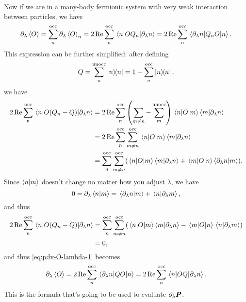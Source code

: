 \documentclass[hyperref, a4paper]{article}
\begin{document}
Now if we are in a many-body fermionic system with very weak interaction between particles,
we have 
\begin{equation}
    \partial_\lambda \expval{O} = \sum_{n}^{\text{occ}} \partial_\lambda \expval{O}_n
    = 2 \Re \sum_{n}^{\text{occ}} \mel{n}{O Q_n}{\partial_\lambda n}
    = 2 \Re \sum_{n}^{\text{occ}} \mel{\partial_\lambda n}{Q_n O}{n}.
    \label{eq:pdv-O-lambda-1}
\end{equation}
This expression can be further simplified:
after defining 
\begin{equation}
    Q = \sum_{n}^{\text{unocc}} \dyad{n} = 1 - \sum_{n}^{\text{occ}} \dyad{n},
\end{equation}
we have
\[
    \begin{aligned}
        2\Re \sum_{n}^{\text{occ}} \mel{n}{O (Q_n - Q)}{\partial_\lambda n}
        &= 2\Re \sum_{n}^{\text{occ}}  \left(
            \sum_{m \neq n} 
            - \sum_{m}^{\text{unocc}}
        \right)
        \mel{n}{O}{m} \braket{m}{\partial_\lambda n}  \\
        &= 2\Re \sum_{n}^{\text{occ}} \sum_{m \neq n}^{\text{occ}}
        \mel{n}{O}{m} \braket{m}{\partial_\lambda n} \\
        &= \sum_{n}^{\text{occ}} \sum_{m \neq n}^{\text{occ}}
        (
            \mel{n}{O}{m} \braket{m}{\partial_\lambda n}
            + \mel{m}{O}{n} \braket{\partial_\lambda n}{m}
        ).
    \end{aligned}
\]
Since $\braket{n}{m}$ doesn't change no matter how you adjust $\lambda$,
we have 
\begin{equation}
    0 = \partial_\lambda \braket{n}{m} 
    = \braket*{\partial_\lambda n}{m} 
    + \braket*{n}{\partial_\lambda m},
    \label{eq:switch-partial}
\end{equation}
and thus 
\[
    \begin{aligned}
        2\Re \sum_{n}^{\text{occ}} \mel{n}{O (Q_n - Q)}{\partial_\lambda n}
        &= \sum_{n}^{\text{occ}} \sum_{m \neq n}^{\text{occ}}
        (
            \mel{n}{O}{m} \braket{m}{\partial_\lambda n}
            - \mel{m}{O}{n} \braket*{n}{\partial_\lambda m}
        ) \\
        &= 0,
    \end{aligned}
\]
and thus \eqref{eq:pdv-O-lambda-1} becomes 
\begin{equation}
    \partial_\lambda \expval{O} 
    = 2 \Re \sum_{n}^{\text{occ}} \mel{\partial_\lambda n}{Q O}{n}
    = 2 \Re \sum_{n}^{\text{occ}} \mel{n}{O Q}{\partial_\lambda n}.
    \label{eq:pdv-O-lambda-2}
\end{equation}
This is the formula that's going to be used 
to evaluate $\partial_\lambda \vb*{P}$.
\end{document}
